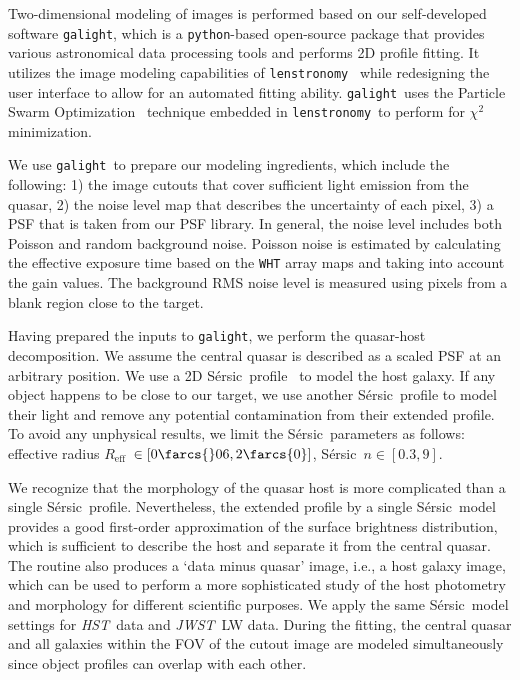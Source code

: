 \documentclass[twocolumn,]{aastex631}
\newcommand{\sersic}{S\'ersic}
\newcommand{\lenstronomy}{\texttt{lenstronomy}}
\newcommand{\galight}{\texttt{galight}}
\newcommand{\reff}{{$R_{\mathrm{eff}}$}}
\newcommand{\hst}{{\it HST}}
\newcommand{\jwst}{{\it JWST}}
\begin{document}
Two-dimensional modeling of images is performed based on our self-developed software \galight, which is a \texttt{python}-based open-source package that provides various astronomical data processing tools and performs 2D profile fitting. It utilizes the image modeling capabilities of \lenstronomy~\citep{2018PDU....22..189B, 2021JOSS....6.3283B} while redesigning the user interface to allow for an automated fitting ability. \galight\ uses the Particle Swarm Optimization~\citep{Kennedy1995} technique embedded in \lenstronomy\ to perform for $\chi ^2$ minimization. 

We use \galight\ to prepare our modeling ingredients, which include the following: 1) the image cutouts that cover sufficient light emission from the quasar, 2) the noise level map that describes the uncertainty of each pixel, 3) a PSF that is taken from our PSF library. In general, the noise level includes both Poisson and random background noise. Poisson noise is estimated by calculating the effective exposure time based on the \texttt{WHT} array maps and taking into account the gain values. The background RMS noise level is measured using pixels from a blank region close to the target. 

Having prepared the inputs to \galight, we perform the quasar-host decomposition. We assume the central quasar is described as a scaled PSF at an arbitrary position. We use a 2D \sersic\ profile~\citep{sersic} to model the host galaxy. If any object happens to be close to our target, we use another \sersic\ profile to model their light and remove any potential contamination from their extended profile. To avoid any unphysical results, we limit the \sersic\ parameters as follows: effective radius \reff~$\in[0\farcs{}06,2\farcs{0}]$, \sersic\ $n\in[0.3,9]$.

We recognize that the morphology of the quasar host is more complicated than a single \sersic\ profile. Nevertheless, the extended profile by a single \sersic\ model provides a good first-order approximation of the surface brightness distribution, which is sufficient to describe the host and separate it from the central quasar. The routine also produces a `data minus quasar' image, i.e., a host galaxy image, which can be used to perform a more sophisticated study of the host photometry and morphology for different scientific purposes. We apply the same \sersic\ model settings for \hst\ data and \jwst\ LW data. During the fitting, the central quasar and all galaxies within the FOV of the cutout image are modeled simultaneously since object profiles can overlap with each other.
\end{document}
